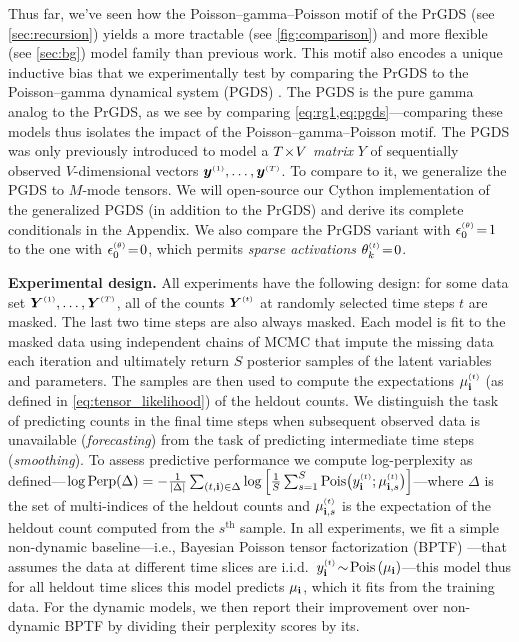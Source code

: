 \documentclass{article}
\begin{document}
Thus far, we've seen how the Poisson--gamma--Poisson motif of the PrGDS (see \cref{sec:recursion}) yields a more tractable (see \cref{fig:comparison}) and more flexible (see \cref{sec:bg}) model family than previous work. This motif also encodes a unique inductive bias that we experimentally test by comparing the PrGDS to the Poisson--gamma dynamical system (PGDS) \cite{schein2016poisson}. The PGDS is the pure gamma analog to the PrGDS, as we see by comparing \cref{eq:rg1,eq:pgds}---comparing these models thus isolates the impact of the Poisson--gamma--Poisson motif. The PGDS was only previously introduced to model a $T \!\times\! V$  \emph{matrix} $Y$ of sequentially observed $V$-dimensional vectors $\boldsymbol{y}^{\mathsmaller{(1)}},\dots, \boldsymbol{y}^{\mathsmaller{(T)}}$. To compare to it, we generalize the PGDS to $M$-mode tensors. We will open-source our Cython implementation of the generalized PGDS (in addition to the PrGDS) and derive its complete conditionals in the Appendix. We also compare the PrGDS variant with $\epstheta \teq 1$ to the one with $\epstheta \teq 0$, which permits \emph{sparse activations} $\thetakt \teq 0$.~

\textbf{Experimental design.} All experiments have the following design: for some data set $\Yten^{\mathsmaller{(1)}},\dots,\Yten^{\mathsmaller{(T)}}$, all of the counts $\Yten^{\mathsmaller{(t)}}$ at randomly selected time steps $t$ are masked. The last two time steps are also always masked. Each model is fit to the masked data using independent chains of MCMC that impute the missing data each iteration and ultimately return $S$ posterior samples of the latent variables and parameters. The samples are then used to compute the expectations $\mudt$ (as defined in \cref{eq:tensor_likelihood}) of the heldout counts. We distinguish the task of predicting counts in the final time steps when subsequent observed data is unavailable (\emph{forecasting}) from the task of predicting intermediate time steps (\emph{smoothing}). To assess predictive performance we compute log-perplexity as defined---$\log \textrm{Perp}(\Delta) = -\frac{1}{|\Delta|}\sum_{(t,\osubs) \in \Delta} \log \Big[\frac{1}{S}\sum_{s=1}^S \textrm{Pois}\big(\ydt; \musdt \big) \Big]$---where $\Delta$ is the set of multi-indices of the heldout counts and $\musdt$ is the expectation of the heldout count computed from the $s^{\textrm{th}}$ sample. In all experiments, we fit a simple non-dynamic baseline---i.e., Bayesian Poisson tensor factorization (BPTF) \cite{schein2015bayesian}---that assumes the data at different time slices are i.i.d.~$y_{\osubs}^{\mathsmaller{(t)}} \tsim \Pois{\mud}$---this model thus for all heldout time slices this model predicts $\mu_{\textbf{\textrm{i}}}$, which it fits from the training data. For the dynamic models, we then report their improvement over non-dynamic BPTF by dividing their perplexity scores by its.~ 
\end{document}
